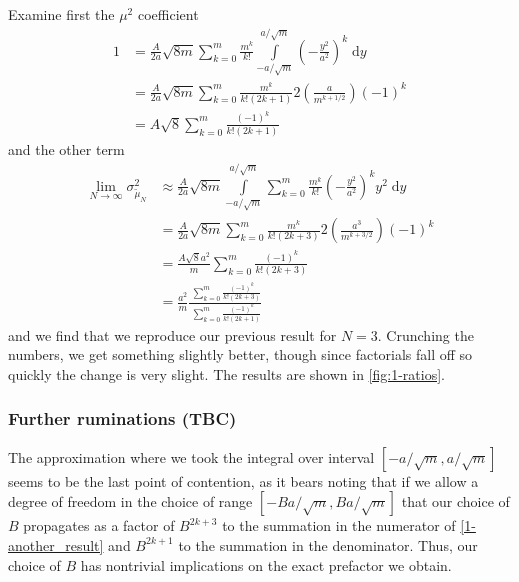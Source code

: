 \documentclass[10pt]{article}
\begin{document}
Examine first the $\mu^2$ coefficient
\begin{align}
    1
        &= \frac{A}{2a}\sqrt{8m}
            \sum\limits_{k=0}^{m}\frac{m^k}{k!}
                \int\limits_{-a/\sqrt{m}}^{a/\sqrt{m}}
                    \left( -\frac{y^2}{a^2} \right)^k
                \;\mathrm{d}y\\
        &= \frac{A}{2a}\sqrt{8m}
            \sum\limits_{k=0}^{m}\frac{m^k}{k!(2k+1)}
                2\left( \frac{a}{m^{k + 1/2}} \right)\left( -1 \right)^{k}\\
        &= A\sqrt{8}\sum\limits_{k=0}^{m}\frac{\left( -1 \right)^{k}}{k!(2k+1)}
\end{align}
and the other term
\begin{align}
    \lim_{N \to \infty}\sigma_{\tilde{\mu}_N}^2
        &\approx \frac{A}{2a}\sqrt{8m}
            \int\limits_{-a/\sqrt{m}}^{a/\sqrt{m}}
                \sum\limits_{k=0}^{m}\frac{m^k}{k!}
                    \left( -\frac{y^2}{a^2} \right)^k
                y^2
            \;\mathrm{d}y\\
        &= \frac{A}{2a}\sqrt{8m}
            \sum\limits_{k=0}^{m}\frac{m^k}{k!(2k+3)}
                2\left( \frac{a^3}{m^{k + 3/2}} \right)\left( -1 \right)^{k}\\
        &= \frac{A\sqrt{8}a^2}{m}\sum\limits_{k=0}^{m}
            \frac{\left( -1 \right)^{k}}{k!(2k+3)}\\
        &= \frac{a^2}{m}\frac{\
                \sum\limits_{k=0}^{m}\frac{\left( -1 \right)^k}{k!(2k+3)}
            }{\
                \sum\limits_{k=0}^{m}\frac{\left( -1 \right)^k}{k!(2k+1)}
            }\label{1-another_result}
\end{align}
and we find that we reproduce our previous result for $N=3$. Crunching the
numbers, we get something slightly better, though since factorials fall off so
quickly the change is very slight. The results are shown in
\autoref{fig:1-ratios}.

\subsubsection{Further ruminations (TBC)}

The approximation where we took the integral over interval $[-a/\sqrt{m},
a/\sqrt{m}]$ seems to be the last point of contention, as it bears noting that
if we allow a degree of freedom in the choice of range $\left[
    -Ba/\sqrt{m}, Ba/\sqrt{m}
\right]$ that our choice of $B$ propagates as a factor of $B^{2k+3}$ to the
summation in the numerator of \autoref{1-another_result} and $B^{2k+1}$ to the
summation in the denominator. Thus, our choice of $B$ has nontrivial
implications on the exact prefactor we obtain.
\end{document}
